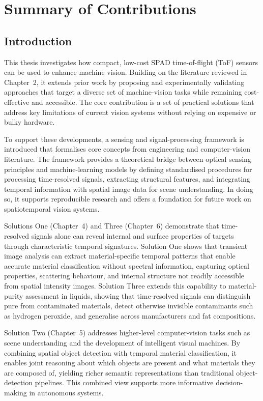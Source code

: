\documentclass[12pt,a4paper,oneside]{report}
\let\oldsection\section
\renewcommand{\section}{\clearpage\oldsection}
\let\oldchapter\chapter
\renewcommand{\chapter}{\thispagestyle{fancy}\oldchapter}
\begin{document}
\newpage
\chapter{Summary of Contributions}
\label{chap:Summary of contributions}

\newpage
\section{Introduction}
\label{sec:chapter7_introduction}
This thesis investigates how compact, low-cost SPAD time-of-flight (ToF) sensors can be used to enhance machine vision. Building on the literature reviewed in Chapter~2, it extends prior work by proposing and experimentally validating approaches that target a diverse set of machine-vision tasks while remaining cost-effective and accessible. The core contribution is a set of practical solutions that address key limitations of current vision systems without relying on expensive or bulky hardware.

To support these developments, a sensing and signal-processing framework is introduced that formalises core concepts from engineering and computer-vision literature. The framework provides a theoretical bridge between optical sensing principles and machine-learning models by defining standardised procedures for processing time-resolved signals, extracting structural features, and integrating temporal information with spatial image data for scene understanding. In doing so, it supports reproducible research and offers a foundation for future work on spatiotemporal vision systems.

Solutions One (Chapter~4) and Three (Chapter~6) demonstrate that time-resolved signals alone can reveal internal and surface properties of targets through characteristic temporal signatures. Solution One shows that transient image analysis can extract material-specific temporal patterns that enable accurate material classification without spectral information, capturing optical properties, scattering behaviour, and internal structure not readily accessible from spatial intensity images. Solution Three extends this capability to material-purity assessment in liquids, showing that time-resolved signals can distinguish pure from contaminated materials, detect otherwise invisible contaminants such as hydrogen peroxide, and generalise across manufacturers and fat compositions.

Solution Two (Chapter~5) addresses higher-level computer-vision tasks such as scene understanding and the development of intelligent visual machines. By combining spatial object detection with temporal material classification, it enables joint reasoning about which objects are present and what materials they are composed of, yielding richer semantic representations than traditional object-detection pipelines. This combined view supports more informative decision-making in autonomous systems.
\end{document}
